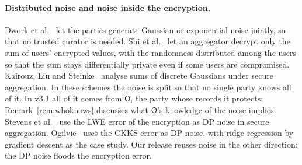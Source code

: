\documentclass[11pt]{article}
\theoremstyle{definition}
\theoremstyle{plain}
\newcommand{\Party}[1]{\textsf{#1}}
\newcommand{\Op}{\Party{O}}
\begin{document}
\paragraph{Distributed noise and noise inside the encryption.} Dwork et al.~\cite{dwork2006our} let the parties generate Gaussian or exponential noise jointly, so that no trusted curator is needed. Shi et al.~\cite{shi2011privacy} let an aggregator decrypt only the sum of users' encrypted values, with the randomness distributed among the users so that the sum stays differentially private even if some users are compromised. Kairouz, Liu and Steinke~\cite{kairouz2021distributed} analyse sums of discrete Gaussians under secure aggregation. In these schemes the noise is split so that no single party knows all of it. In v3.1 all of it comes from $\Op$, the party whose records it protects; Remark~\ref{rem:whoknows} discusses what $\Op$'s knowledge of the noise implies. Stevens et al.~\cite{stevens2022efficient} use the LWE error of the encryption as DP noise in secure aggregation. Ogilvie~\cite{ogilvie2024differential} uses the CKKS error as DP noise, with ridge regression by gradient descent as the case study. Our release reuses noise in the other direction: the DP noise floods the encryption error.
\end{document}
